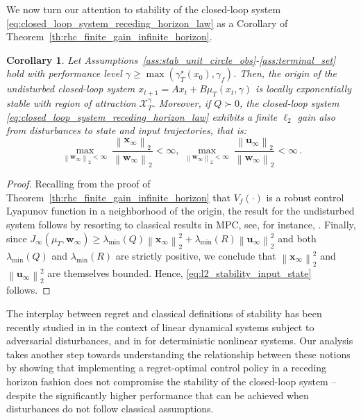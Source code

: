 \documentclass[conference]{IEEEtran}
\newcommand{\normtwo}[1]{\left\lVert#1\right\rVert_{2}}
\newtheorem{corollary}{Corollary}
\begin{document}
We now turn our attention to stability of the closed-loop system \eqref{eq:closed_loop_system_receding_horizon_law} as a Corollary of Theorem~\ref{th:rhc_finite_gain_infinite_horizon}.%

\begin{corollary}
    Let Assumptions~\ref{ass:stab_unit_circle_obs}-\ref{ass:terminal_set} hold with performance level $\gamma \geq \operatorname{max}(\gamma_T^\star(x_0), \gamma_f)$. Then, the origin of the undisturbed closed-loop system $x_{t+1} = Ax_t + B\mu_T(x_t, \gamma)$ is locally exponentially stable with region of attraction $\mathcal{X}_T^\gamma$. Moreover, if $Q\succ 0$, the closed-loop system \eqref{eq:closed_loop_system_receding_horizon_law} exhibits a finite $\ell_2$ gain also from disturbances to state and input trajectories, that is:
    \begin{equation}
    \label{eq:l2_stability_input_state}
    \max_{\normtwo{\mathbf{w}_\infty} < \infty} ~ \frac{\normtwo{\mathbf{x}_\infty}}{\normtwo{\mathbf{w}_\infty}}< \infty,~ \max_{\normtwo{\mathbf{w}_\infty} < \infty} ~ \frac{\normtwo{\mathbf{u}_\infty}}{\normtwo{\mathbf{w}_\infty}} < \infty\,.
\end{equation}
\end{corollary}

\begin{proof}
    Recalling from the proof of Theorem~\ref{th:rhc_finite_gain_infinite_horizon} that $V_f(\cdot)$ is a robust control Lyapunov function in a neighborhood of the origin, the result for the undisturbed system follows by resorting to classical results in MPC, see, for instance, \cite[Sect. 3]{mayne2000constrained}. Finally, since $J_\infty(\mu_T, \mathbf{w}_\infty) \geq \lambda_{\operatorname{min}}(Q) \normtwo{\mathbf{x}_\infty}^2 + \lambda_{\operatorname{min}}(R) \normtwo{\mathbf{u}_\infty}^2$ and both $\lambda_{\operatorname{min}}(Q)$ and $\lambda_{\operatorname{min}}(R)$ are strictly positive, we conclude that $\normtwo{\mathbf{x}_\infty}^2$ and $\normtwo{\mathbf{u}_\infty}^2$ are themselves bounded. Hence, \eqref{eq:l2_stability_input_state} follows.
\end{proof}

The interplay between regret and classical definitions of stability has been recently studied in \cite{karapetyan2022implications} in the context of linear dynamical systems subject to adversarial disturbances, and in \cite{nonhoff2022relation} for deterministic nonlinear systems. Our analysis takes another step towards understanding the relationship between these notions by showing that implementing a regret-optimal control policy in a receding horizon fashion does not compromise the stability of the closed-loop system – despite the significantly higher performance that can be achieved when disturbances do not follow classical assumptions.
\end{document}
